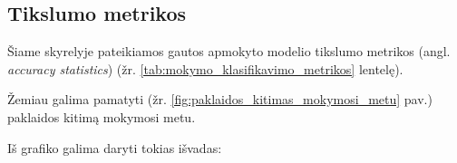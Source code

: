 \subsection{Tikslumo metrikos}
\label{subsec:mokymo_tikslumo_metrikos}

Šiame skyrelyje pateikiamos gautos apmokyto modelio tikslumo metrikos (angl. \textit{accuracy statistics}) (žr. \ref{tab:mokymo_klasifikavimo_metrikos} lentelę).



Žemiau galima pamatyti (žr. \ref{fig:paklaidos_kitimas_mokymosi_metu} pav.) paklaidos kitimą mokymosi metu.



Iš grafiko galima daryti tokias išvadas:
